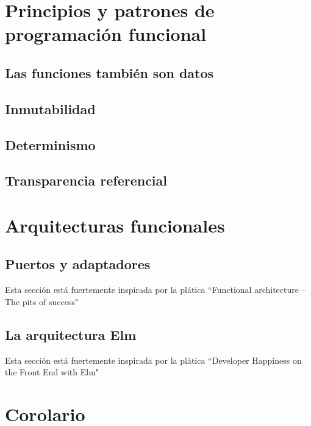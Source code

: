 \documentclass{article}
\begin{document}
\section{Principios y patrones de programación funcional}


\subsection{Las funciones también son datos}


\subsection{Inmutabilidad}


\subsection{Determinismo}


\subsection{Transparencia referencial}


\section{Arquitecturas funcionales}


\subsection{Puertos y adaptadores}
Esta sección está fuertemente inspirada por la plática ``Functional architecture – The pits of success"\cite{functional-architecture}


\subsection{La arquitectura Elm}
Esta sección está fuertemente inspirada por la plática ``Developer Happiness on the Front End with Elm"\cite{developer-happiness-elm}


\section{Corolario}
\end{document}
